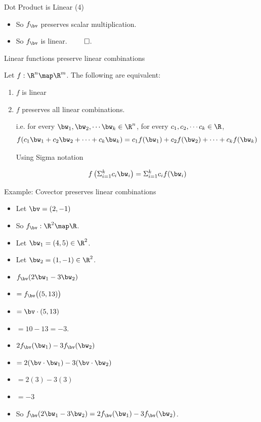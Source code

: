 \documentclass{beamer}
\begin{document}
\begin{frame}{Dot Product is Linear (4)}

\begin{itemize}
\item So $f_{\bv}$ preserves scalar multiplication.
\item So $f_{\bv}$ is linear. $\qed$.
\end{itemize}

\end{frame}

\begin{frame}{Linear functions preserve linear combinations}
\begin{lemma}
Let $f:\R^n\map\R^m$. The following are equivalent:
\begin{enumerate}
\item $f$ is linear
\item $f$ preserves all linear combinations.

\pause

i.e. for every
$\bw_1,\bw_2,\cdots\bw_k\in\R^n$, for every $c_1,c_2,\cdots c_k\in\R$,
$$f(c_1 \bw_1 + c_2 \bw_2 + \cdots + c_k \bw_k) = c_1 f(\bw_1) + c_2 f(\bw_2) + \cdots + c_k f(\bw_k)$$

\pause

Using Sigma notation

$$f\left(\Sigma_{i=1}^k{c_i \bw_i}\right) = \Sigma_{i=1}^k{c_i f(\bw_i)}$$

\end{enumerate}
\end{lemma}
\end{frame}


\begin{frame}{Example: Covector preserves linear combinations}

\begin{itemize}
\item Let $\bv = (2, -1)$
\item So $f_{\bv}:\R^2 \map \R$.
\item Let $\bw_1 = (4, 5) \in \R^2$.
\item Let $\bw_2 = (1,-1) \in \R^2$.
\item $f_\bv(2\bw_1 -3\bw_2)$
\item $=f_\bv\bigl((5, 13)\bigr)$
\item $=\bv \cdot (5, 13)$
\item $=10 - 13 = -3$.
\item $2 f_{\bv}(\bw_1) -3 f_{\bv}(\bw_2)$
\item $= 2 (\bv \cdot \bw_1) -3 (\bv \cdot \bw_2)$
\item $=2 (3) - 3(3)$
\item $=-3$
\item So $f_\bv(2\bw_1 -3\bw_2) = 2f_{\bv}(\bw_1) -3 f_{\bv}(\bw_2)$.
\end{itemize}

\end{frame}
\end{document}

